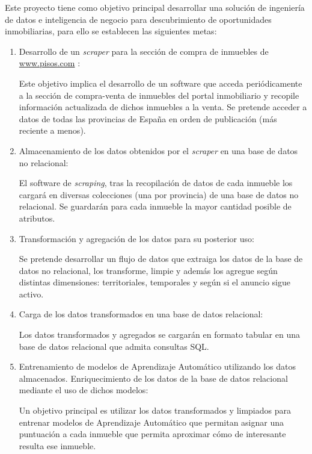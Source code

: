 Este proyecto tiene como objetivo principal desarrollar una solución de ingeniería de datos e inteligencia de negocio para descubrimiento de oportunidades inmobiliarias, para ello se establecen las siguientes metas:

\begin{enumerate}

\item Desarrollo de un \textit{\textit{scraper}} para la sección de compra de inmuebles de \url{www.pisos.com} :

Este objetivo implica el desarrollo de un software que acceda periódicamente a la sección de compra-venta de inmuebles del portal inmobiliario y recopile información actualizada de dichos inmuebles a la venta. Se pretende acceder a datos de todas las provincias de España en orden de publicación (más reciente a menos).

\item Almacenamiento de los datos obtenidos por el \textit{scraper} en una base de datos no relacional:

El software de \textit{scraping}, tras la recopilación de datos de cada inmueble los cargará en diversas colecciones (una por provincia) de una base de datos no relacional. Se guardarán para cada inmueble la mayor cantidad posible de atributos.

\item Transformación y agregación de los datos para su posterior uso:

Se pretende desarrollar un flujo de datos que extraiga los datos de la base de datos no relacional, los transforme, limpie y además los agregue según distintas dimensiones: territoriales, temporales y según si el anuncio sigue activo.

\clearpage
\item Carga de los datos transformados en una base de datos relacional:

Los datos transformados y agregados se cargarán en formato tabular en una base de datos relacional que admita consultas SQL.

\item Entrenamiento de modelos de Aprendizaje Automático utilizando los datos almacenados. Enriquecimiento de los datos de la base de datos relacional mediante el uso de dichos modelos:

Un objetivo principal es utilizar los datos transformados y limpiados para entrenar modelos de Aprendizaje Automático que permitan asignar una puntuación a cada inmueble que permita aproximar cómo de interesante resulta ese inmueble.


\end{enumerate}
